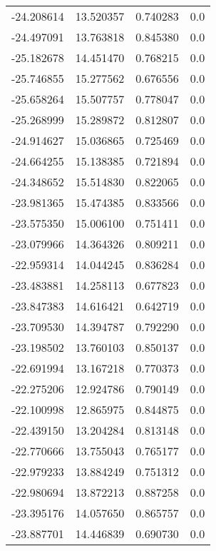 \begin{tabular}{rrrr}
      -24.208614 &        13.520357 &    0.740283 &   0.0 \\
      -24.497091 &        13.763818 &    0.845380 &   0.0 \\
      -25.182678 &        14.451470 &    0.768215 &   0.0 \\
      -25.746855 &        15.277562 &    0.676556 &   0.0 \\
      -25.658264 &        15.507757 &    0.778047 &   0.0 \\
      -25.268999 &        15.289872 &    0.812807 &   0.0 \\
      -24.914627 &        15.036865 &    0.725469 &   0.0 \\
      -24.664255 &        15.138385 &    0.721894 &   0.0 \\
      -24.348652 &        15.514830 &    0.822065 &   0.0 \\
      -23.981365 &        15.474385 &    0.833566 &   0.0 \\
      -23.575350 &        15.006100 &    0.751411 &   0.0 \\
      -23.079966 &        14.364326 &    0.809211 &   0.0 \\
      -22.959314 &        14.044245 &    0.836284 &   0.0 \\
      -23.483881 &        14.258113 &    0.677823 &   0.0 \\
      -23.847383 &        14.616421 &    0.642719 &   0.0 \\
      -23.709530 &        14.394787 &    0.792290 &   0.0 \\
      -23.198502 &        13.760103 &    0.850137 &   0.0 \\
      -22.691994 &        13.167218 &    0.770373 &   0.0 \\
      -22.275206 &        12.924786 &    0.790149 &   0.0 \\
      -22.100998 &        12.865975 &    0.844875 &   0.0 \\
      -22.439150 &        13.204284 &    0.813148 &   0.0 \\
      -22.770666 &        13.755043 &    0.765177 &   0.0 \\
      -22.979233 &        13.884249 &    0.751312 &   0.0 \\
      -22.980694 &        13.872213 &    0.887258 &   0.0 \\
      -23.395176 &        14.057650 &    0.865757 &   0.0 \\
      -23.887701 &        14.446839 &    0.690730 &   0.0 \\

\end{tabular}
